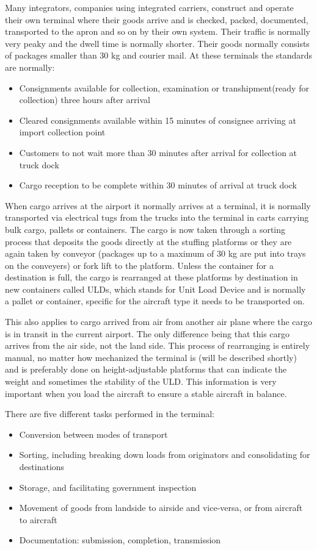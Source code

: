 Many integrators, companies using integrated carriers, construct and operate their own terminal where their goods arrive and is checked, packed, documented, transported to the apron and so on by their own system. 
Their traffic is normally very peaky and the dwell time is normally shorter. Their goods normally consists of packages smaller than 30 kg and courier mail. At these terminals the standards are normally:
\begin{itemize}
\item Consignments available for collection, examination or transhipment(ready for collection) three hours after arrival
\item Cleared consignments available within 15 minutes of consignee arriving at import collection point
\item Customers to not wait more than 30 minutes after arrival for collection at truck dock
\item Cargo reception to be complete within 30 minutes of arrival at truck dock
\end{itemize}

When cargo arrives at the airport it normally arrives at a terminal, it is normally transported via electrical tugs from the trucks into the terminal in carts carrying bulk cargo, pallets or containers. The cargo is now taken through a sorting process that deposits the goods directly at the stuffing platforms or they are again taken by conveyor (packages up to a maximum of 30 kg are put into trays on the conveyers) or fork lift to the platform.
Unless the container for a destination is full, the cargo is rearranged at these platforms by destination in new containers called ULDs, which stands for Unit Load Device and is normally a pallet or container, specific for the aircraft type it needs to be transported on.


This also applies to cargo arrived from air from another air plane where the cargo is in transit in the current airport. The only difference being that this cargo arrives from the air side, not the land side.
This process of rearranging is entirely manual, no matter how mechanized the terminal is (will be described shortly) and is preferably done on height-adjustable platforms that can indicate the weight and sometimes the stability of the ULD. This information is very important when you load the aircraft to ensure a stable aircraft in balance.


There are five different tasks performed in the terminal:
\begin{itemize}
\item Conversion between modes of transport
\item Sorting, including breaking down loads from originators and consolidating for destinations
\item Storage, and facilitating government inspection
\item Movement of goods from landside to airside and vice-versa, or from aircraft to aircraft
\item Documentation: submission, completion, transmission
\end{itemize}

